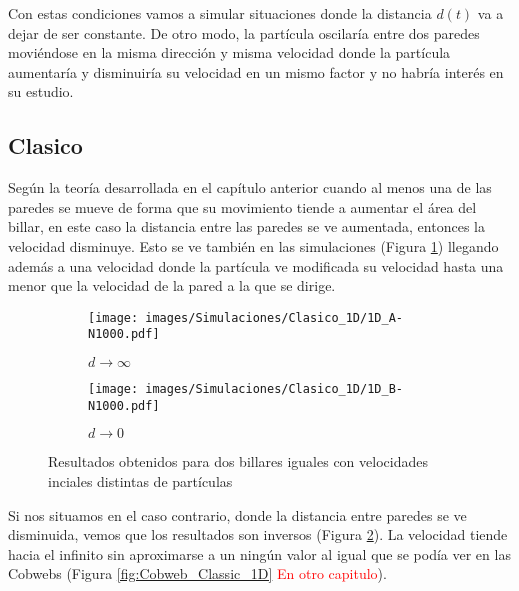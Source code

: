 \vspace{3mm}

Con estas condiciones vamos a simular situaciones donde la distancia \( d(t) \) va a dejar de ser constante. De otro modo, la partícula oscilaría entre dos paredes moviéndose en la misma dirección y misma velocidad donde la partícula aumentaría y disminuiría su velocidad en un mismo factor y no habría interés en su estudio.

\subsection{Clasico}

Según la teoría desarrollada en el capítulo anterior cuando al menos una de las paredes se mueve de forma que su movimiento tiende a aumentar el área del billar, en este caso la distancia entre las paredes se ve aumentada, entonces la velocidad disminuye. Esto se ve también en las simulaciones (Figura \ref{fig:clasico_1D_A}) llegando además a una velocidad donde la partícula ve modificada su velocidad hasta una menor que la velocidad de la pared a la que se dirige.

\begin{figure}[!h]
    \begin{subfigure}[b]{0.5\textwidth}
        \centering
        \texttt{[image: images/Simulaciones/Clasico\_1D/1D\_A-N1000.pdf]}
        \caption{\( d \rightarrow \infty \)}
        \label{fig:clasico_1D_A}
    \end{subfigure}
    \hfill
    \begin{subfigure}[b]{0.5\textwidth}
        \centering
        \texttt{[image: images/Simulaciones/Clasico\_1D/1D\_B-N1000.pdf]}
        \caption{\( d \rightarrow 0 \)}
        \label{fig:clasico_1D_B}
    \end{subfigure}
    \caption{Resultados obtenidos para dos billares iguales con velocidades inciales distintas de partículas}
    \label{fig:clasico_1D}
\end{figure}

Si nos situamos en el caso contrario, donde la distancia entre paredes se ve disminuida, vemos que los resultados son inversos (Figura \ref{fig:clasico_1D_B}). La velocidad tiende hacia el infinito sin aproximarse a un ningún valor al igual que se podía ver en las Cobwebs (Figura \ref{fig:Cobweb_Classic_1D} \textcolor{red}{En otro capitulo}). 

\vspace{3mm}

